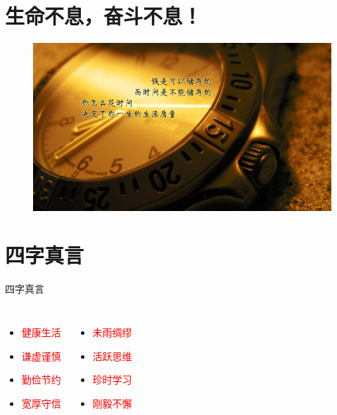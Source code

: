 \section{生命不息，奋斗不息！}
\begin{frame}
	\begin{figure}[http]
    \centering
    \includegraphics[width=14cm]{time.jpg}
    \label{fig:time}
    \end{figure}
\end{frame}

\section{四字真言}
\begin{frame}{四字真言}
    \transdissolve
    \begin{columns}
    \column{5cm}
    \begin{itemize}
        \item \textcolor{red}{健康生活}
        \item \textcolor{red}{谦虚谨慎}
        \item \textcolor{red}{勤俭节约}
        \item \textcolor{red}{宽厚守信}
    \end{itemize}
    \column{5cm}
    \begin{itemize}
        \item \textcolor{red}{未雨绸缪}
        \item \textcolor{red}{活跃思维}
        \item \textcolor{red}{珍时学习}
        \item \textcolor{red}{刚毅不懈}
    \end{itemize}
    \end{columns}
\end{frame}
